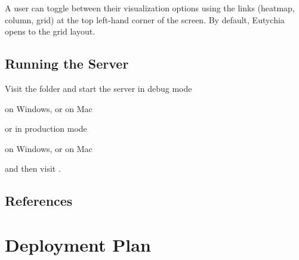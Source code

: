 \documentclass[letterpaper,10pt,english]{sphinxmanual}
\begin{document}
A user can toggle between their visualization options using the links
(heatmap, column, grid) at the top left-hand corner of the screen. By
default, Eutychia opens to the grid layout.


\section{Running the Server}
\label{\detokenize{user-interface:running-the-server}}
Visit the folder  and start the server in debug mode

\begin{sphinxVerbatim}[commandchars=\\\{\}]
 \PYGZbs{}
\end{sphinxVerbatim}

on Windows, or on Mac

\begin{sphinxVerbatim}[commandchars=\\\{\}]
 
\end{sphinxVerbatim}

or in production mode

\begin{sphinxVerbatim}[commandchars=\\\{\}]
 \PYGZbs{}
\end{sphinxVerbatim}

on Windows, or on Mac

\begin{sphinxVerbatim}[commandchars=\\\{\}]
 
\end{sphinxVerbatim}

and then visit .


\section{References}
\label{\detokenize{user-interface:references}}

\chapter{Deployment Plan}
\label{\detokenize{deployment:deployment-plan}}\label{\detokenize{deployment:sec-deployment}}\label{\detokenize{deployment::doc}}
\end{document}
